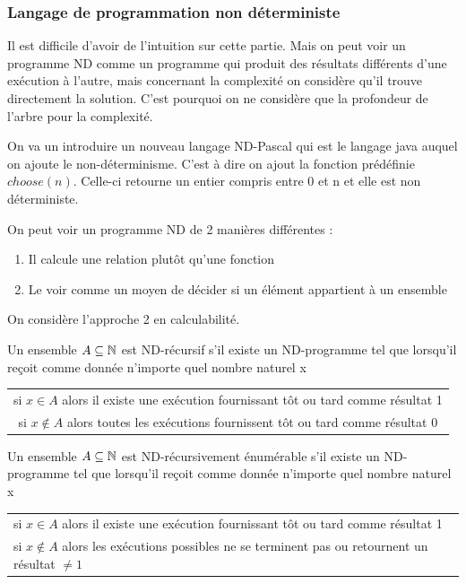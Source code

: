 
\subsubsection{Langage de programmation non déterministe}
\label{ssub:langague_de_programmation_non_d_terministe}

\begin{myrem}
	Il est difficile d'avoir de l'intuition sur cette partie. Mais on peut 
	voir un programme ND comme un programme qui produit des résultats 
	différents d'une exécution à l'autre, mais concernant la complexité on 
	considère qu'il trouve directement la solution. C'est pourquoi on ne 
	considère que la profondeur de l'arbre pour la complexité.
\end{myrem}

On va un introduire un nouveau langage ND-Pascal qui est le langage java 
auquel on ajoute le non-déterminisme. C'est à dire on ajout la fonction 
prédéfinie $choose(n)$. Celle-ci retourne un entier compris entre 0 et n et elle 
est non déterministe.

On peut voir un programme ND de 2 manières différentes :
\begin{enumerate}
	\item Il calcule une relation plutôt qu'une fonction
	\item Le voir comme un moyen de décider si un élément appartient à un 
		ensemble
\end{enumerate}
On considère l'approche 2 en calculabilité.

\begin{mydef}[ND-récursif]
	Un ensemble $A \subseteq \mathbb{N}$ est ND-récursif s’il existe un 
	ND-programme tel que lorsqu'il reçoit comme donnée n'importe quel nombre 
	naturel x \\
	\begin{tabular}{c}
	si $x \in A$ alors il existe une exécution fournissant tôt ou tard 
	comme résultat 1 \\
	si $x \notin A$ alors toutes les exécutions fournissent tôt ou tard 
	comme résultat 0 \\
	\end{tabular}
\end{mydef}

\begin{mydef}
	Un ensemble $A \subseteq \mathbb{N}$ est ND-récursivement énumérable s’il existe un 
	ND-programme tel que lorsqu'il reçoit comme donnée n'importe quel nombre 
	naturel x
	\begin{tabular}{l}
	si $x \in A$ alors il existe une exécution fournissant tôt ou tard 
	comme résultat 1 \\
	si $x \notin A$ alors les exécutions possibles ne se terminent pas ou 
	retournent un résultat $\neq 1$ \\
	\end{tabular}
\end{mydef}

